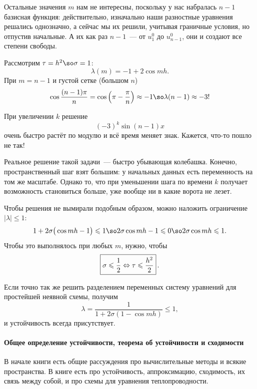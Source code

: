 \documentclass{trlnotes}
\begin{document}
    \begin{rem}
        Остальные значения $m$ нам не интересны, поскольку у нас набралась $n-1$ базисная функция: действительно, изначально наши разностные уравнения решались однозначно, а сейчас мы их решили, учитывая граничные условия, но отпустив начальные. А их как раз $n - 1$~--- от $u^0_1$ до $u^0_{n-1}$, они и создают все степени свободы.
    \end{rem}

    Рассмотрим $\tau = h^2 \so \sigma = 1$:
    \[
        \lambda(m) = -1 + 2 \cos mh.
    \]
    При $m = n - 1$ и густой сетке (большом $n$)
    \[
        \cos \dfrac{(n - 1)\pi}{n} = \cos \left(\pi - \dfrac{\pi}{n}\right) \approx -1 \so \lambda(n - 1) \approx -3!
    \]

    При увеличении $k$ решение
    \[
        (-3)^k \sin(n - 1)x
    \]
    очень быстро растёт по модулю и всё время меняет знак. Кажется, что-то пошло не так!

    \begin{rem}
        Реальное решение такой задачи~--- быстро убывающая колебашка. Конечно, пространственный шаг взят большим: у начальных данных есть переменность на том же масштабе. Однако то, что при уменьшении шага по времени $k$ получает возможность становиться больше, уже вообще ни в какие ворота не лезет.
    \end{rem}


    Чтобы решения не вымирали подобным образом, можно наложить ограничение $|\lambda| \leqslant 1$:
    \[
        1 + 2\sigma \big(\cos mh - 1\big) \leqslant 1 \so 2\sigma \cos mh - 1 \leqslant 0 \so 2 \sigma \cos mh \leqslant 1.
    \]
    Чтобы это выполнялось при любых $m$, нужно, чтобы
    \[
        \boxed{\sigma \leqslant \dfrac{1}{2} \Leftrightarrow \tau \leqslant \dfrac{h^2}{2}} \, .
    \]

    Если точно так же решить разделением переменных систему уравнений для простейшей неявной схемы, получим
    \[
        \lambda = \dfrac{1}{1 + 2\sigma(1 - \cos mh)} \leqslant 1,
    \]
    и устойчивость всегда присутствует.

    \paragraph{Общее определение устойчивости, теорема об устойчивости и сходимости}

    В начале книги \cite{gavurin} есть общие рассуждения про вычислительные методы и всякие пространства. В книге \cite{comp-krilov-2} есть про устойчивость, аппроксимацию, сходимость, их связь между собой, и про схемы для уравнения теплопроводности.
\end{document}
